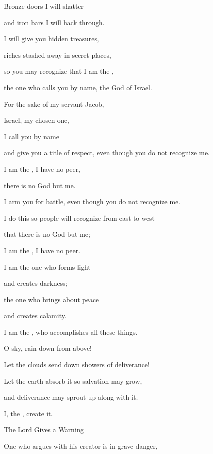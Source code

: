 {\par }{\Q Bronze
doors
I will shatter
\par }{\Q and iron
bars
I will hack through.
\par }{\Q {}I will give
you hidden
treasures,
\par }{\Q riches stashed away
in secret places,
\par }{\Q so
you may recognize
that
I am
the {},
\par }{\Q the one who calls
you by name,
the God
of Israel.
\par }{\Q {}For the sake
of my servant
Jacob,
\par }{\Q Israel,
my chosen one,
\par }{\Q I call
you by name
\par }{\Q and give you a title of respect,
even though you do not
recognize me.
\par }{\Q {}I
am the
{}, I have no
peer,
\par }{\Q there is no
God
but me.
\par }{\Q I arm
you for battle, even though you do not
recognize me.
\par }{\Q {}I do this so
people will recognize
from east
to west
\par }{\Q that
there is no
God but
me;
\par }{\Q I
am the
{}, I have no
peer.
\par }{\Q {}I am the one who forms
light
\par }{\Q and creates
darkness;
\par }{\Q the one who brings
about peace
\par }{\Q and creates
calamity.
\par }{\Q I
am the
{}, who accomplishes
all
these things.
\par }{\Q {}O sky,
rain
down from above!
\par }{\Q Let the clouds
send down showers
of deliverance!
\par }{\Q Let the earth
absorb
it so salvation may grow,

\par }{\Q and deliverance
may sprout
up along with it.
\par }{\Q I,
the {}, create it.
\par }{\SH The Lord Gives a Warning
\par }{\Q {}One who argues
with his creator
is in grave danger,

}
